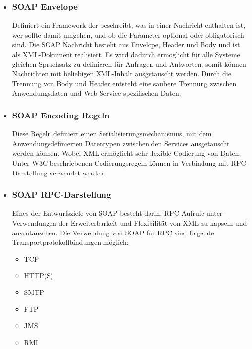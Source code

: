 \begin{itemize}
\item \subsubsection*{SOAP Envelope} Definiert ein Framework der beschreibt, was in einer Nachricht enthalten ist, wer sollte damit umgehen, und ob die Parameter optional oder obligatorisch sind. Die SOAP Nachricht besteht aus Envelope, Header und Body und ist als XML-Dokument realisiert. Es wird dadurch ermöglicht für alle Systeme gleichen Sprachsatz zu definieren für Anfragen und Antworten, somit können Nachrichten mit beliebigen XML-Inhalt ausgetauscht werden.
Durch die Trennung von Body und Header entsteht eine saubere Trennung zwischen Anwendungsdaten und Web Service spezifischen Daten.
\item \subsubsection*{SOAP Encoding Regeln} Diese Regeln definiert einen Serialisierungsmechanismus, mit dem Anwendungsdefinierten Datentypen zwischen den Services ausgetauscht werden können. Wobei XML ermöglicht sehr flexible Codierung von Daten. Unter W3C beschriebenen Codierungsregeln können in Verbindung mit RPC-Darstellung verwendet werden.
\item \subsubsection*{SOAP RPC-Darstellung} Eines der Entwurfsziele von SOAP besteht darin, RPC-Aufrufe unter Verwendungen der Erweiterbarkeit und Flexibilität von XML zu kapseln und auszutauschen.
Die Verwendung von SOAP für RPC sind folgende Transportprotokollbindungen möglich:
\begin{itemize}
\item TCP
\item HTTP(S)
\item SMTP
\item FTP
\item JMS
\item RMI
\end{itemize}
\end{itemize}

